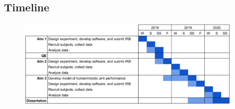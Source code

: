 \documentclass[float=false, crop=false]{standalone}
\begin{document}
\subsection{Timeline}

\begin{figure}[h!]
    \begin{center}
        \includegraphics[width=\linewidth]{./../img/image1.png}
    \end{center}
\end{figure}
\end{document}
